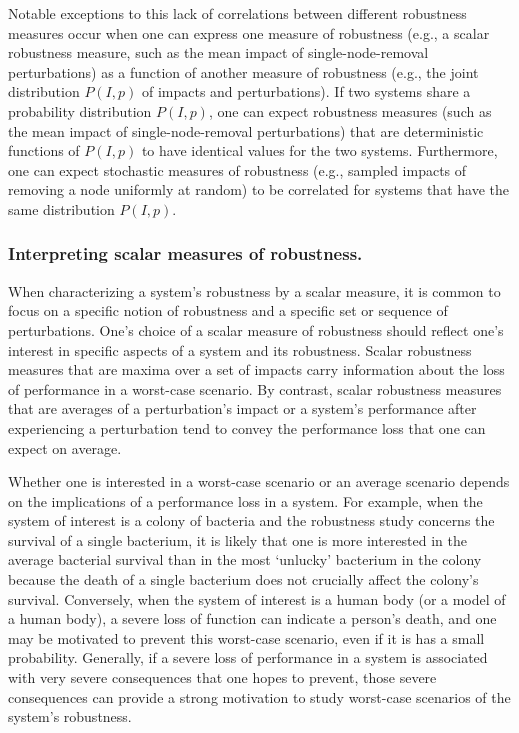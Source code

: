 \documentclass{comnet-mod}
\begin{document}
Notable exceptions to this lack of correlations between different robustness measures occur when one can express one measure of robustness (e.g., a scalar robustness measure, such as the mean impact of single-node-removal perturbations) as a function of another measure of robustness (e.g., the joint distribution $P(I,p)$ of impacts and perturbations). If two systems share a probability distribution $P(I,p)$, one can expect robustness measures (such as the mean impact of single-node-removal perturbations) that are deterministic functions of $P(I,p)$ to have identical values for the two systems. Furthermore, one can expect stochastic measures of robustness (e.g., sampled impacts of removing a node uniformly at random) to be correlated for systems that have the same distribution $P(I,p)$.


\subsubsection{Interpreting scalar measures of robustness.}\label{sec:robustness_applications}

When characterizing a system's robustness by a scalar measure, it is common to focus on a specific notion of robustness and a specific set or sequence of perturbations. One's choice of a scalar measure of robustness should reflect one's interest in specific aspects of a system and its robustness. Scalar robustness measures that are maxima over a set of impacts carry information about the loss of performance in a worst-case scenario. By contrast, scalar robustness measures that are averages of a perturbation's impact or a system's performance after experiencing a perturbation tend to convey the performance loss that one can expect on average. 

Whether one is interested in a worst-case scenario or an average scenario depends on the implications of a performance loss in a system. For example, when the system of interest is a colony of bacteria and the robustness study concerns the survival of a single bacterium, it is likely that one is more interested in the average bacterial survival than in the most `unlucky' bacterium in the colony because the death of a single bacterium does not crucially affect the colony's survival. Conversely, when the system of interest is a human body (or a model of a human body), a severe loss of function can indicate a person's death, and one may be motivated to prevent this worst-case scenario, even if it is has a small probability.
Generally, if a severe loss of performance in a system is associated with very severe consequences that one hopes to prevent, those severe consequences can provide a strong motivation to study worst-case scenarios of the system's robustness.
\end{document}
